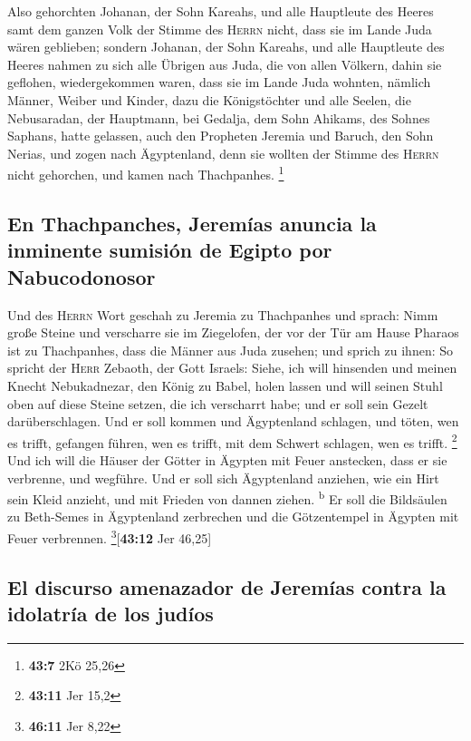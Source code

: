  Also gehorchten Johanan, der Sohn Kareahs, und alle
Hauptleute des Heeres samt dem ganzen Volk der Stimme des \textsc{Herrn}
nicht, dass sie im Lande Juda wären geblieben;  sondern
Johanan, der Sohn Kareahs, und alle Hauptleute des Heeres nahmen zu sich
alle Übrigen aus Juda, die von allen Völkern, dahin sie geflohen,
wiedergekommen waren, dass sie im Lande Juda wohnten, 
nämlich Männer, Weiber und Kinder, dazu die Königstöchter und alle
Seelen, die Nebusaradan, der Hauptmann, bei Gedalja, dem Sohn Ahikams,
des Sohnes Saphans, hatte gelassen, auch den Propheten Jeremia und
Baruch, den Sohn Nerias,  und zogen nach Ägyptenland, denn
sie wollten der Stimme des \textsc{Herrn} nicht gehorchen, und kamen
nach Thachpanhes. \footnote{\textbf{43:7} 2Kö 25,26}

\hypertarget{en-thachpanches-jeremuxedas-anuncia-la-inminente-sumisiuxf3n-de-egipto-por-nabucodonosor}{%
\subsection{En Thachpanches, Jeremías anuncia la inminente sumisión de
Egipto por
Nabucodonosor}\label{en-thachpanches-jeremuxedas-anuncia-la-inminente-sumisiuxf3n-de-egipto-por-nabucodonosor}}

 Und des \textsc{Herrn} Wort geschah zu Jeremia zu
Thachpanhes und sprach:  Nimm große Steine und verscharre
sie im Ziegelofen, der vor der Tür am Hause Pharaos ist zu Thachpanhes,
dass die Männer aus Juda zusehen;  und sprich zu ihnen:
So spricht der \textsc{Herr} Zebaoth, der Gott Israels: Siehe, ich will
hinsenden und meinen Knecht Nebukadnezar, den König zu Babel, holen
lassen und will seinen Stuhl oben auf diese Steine setzen, die ich
verscharrt habe; und er soll sein Gezelt darüberschlagen.
 Und er soll kommen und Ägyptenland schlagen, und töten,
wen es trifft, gefangen führen, wen es trifft, mit dem Schwert schlagen,
wen es trifft. \footnote{\textbf{43:11} Jer 15,2}  Und
ich will die Häuser der Götter in Ägypten mit Feuer anstecken, dass er
sie verbrenne, und wegführe. Und er soll sich Ägyptenland anziehen, wie
ein Hirt sein Kleid anzieht, und mit Frieden von dannen ziehen.
\textsuperscript{b}  Er soll die Bildsäulen zu Beth-Semes
in Ägyptenland zerbrechen und die Götzentempel in Ägypten mit Feuer
verbrennen. \footnote{\textbf{46:11} Jer 8,22}{[}\textbf{43:12} Jer
46,25{]}

\hypertarget{el-discurso-amenazador-de-jeremuxedas-contra-la-idolatruxeda-de-los-juduxedos}{%
\subsection{El discurso amenazador de Jeremías contra la idolatría de
los
judíos}\label{el-discurso-amenazador-de-jeremuxedas-contra-la-idolatruxeda-de-los-juduxedos}}

